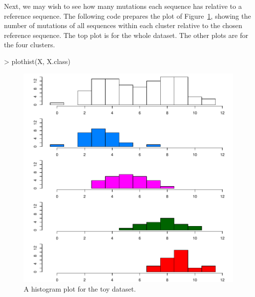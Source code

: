 Next, we may wish to see how many mutations each sequence has relative to a reference sequence.
The following code prepares the plot of Figure~\ref{fig:toyhist}, showing the number of mutations of all sequences within each cluster relative to the chosen reference sequence.
The top plot is for the whole dataset.
The other plots are for the four clusters.
\begin{Code}
> plothist(X, X.class)
\end{Code}
\begin{figure}[h]
\begin{center}
\includegraphics[width=5.0in]{./phyclust-include/f-toyhist}
\caption{A histogram plot for the toy dataset.}
\label{fig:toyhist}
\end{center}
\end{figure}

